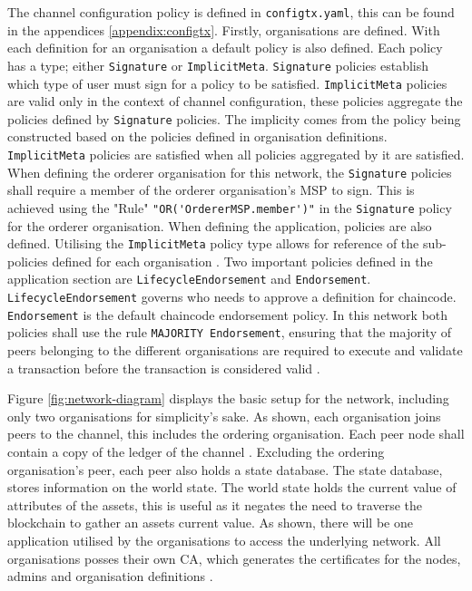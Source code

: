 The channel configuration policy is defined in \lstinline{configtx.yaml}, this can be found in the appendices \ref{appendix:configtx}. 
Firstly, organisations are defined. With each definition for an organisation a default policy is also defined. 
Each policy has a type; either \lstinline{Signature} or \lstinline{ImplicitMeta}. 
\lstinline{Signature} policies establish which type of user must sign for a policy to be satisfied. 
\lstinline{ImplicitMeta} policies are valid only in the context of channel configuration, these policies aggregate the policies defined by \lstinline{Signature} policies. 
The implicity comes from the policy being constructed based on the policies defined in organisation definitions. 
\lstinline{ImplicitMeta} policies are satisfied when all policies aggregated by it are satisfied. \cite{noauthor_policies_nodate}
When defining the orderer organisation for this network, the \lstinline{Signature} policies shall require a member of the orderer organisation's MSP to sign. 
This is achieved using the "Rule" \lstinline{"OR('OrdererMSP.member')"} in the \lstinline{Signature} policy for the orderer organisation. 
When defining the application, policies are also defined. 
Utilising the \lstinline{ImplicitMeta} policy type allows for reference of the sub-policies defined for each organisation \cite{noauthor_policies_nodate}. 
Two important policies defined in the application section are \lstinline{LifecycleEndorsement} and \lstinline{Endorsement}. 
\lstinline{LifecycleEndorsement} governs who needs to approve a definition for chaincode. 
\lstinline{Endorsement} is the default chaincode endorsement policy. 
In this network both policies shall use the rule \lstinline{MAJORITY Endorsement}, ensuring that the majority of peers belonging to the different organisations are required to execute and validate a transaction before the transaction is considered valid \cite{noauthor_policies_nodate}.

Figure \ref{fig:network-diagram} displays the basic setup for the network, including only two organisations for simplicity's sake. 
As shown, each organisation joins peers to the channel, this includes the ordering organisation. 
Each peer node shall contain a copy of the ledger of the channel \cite{noauthor_how_nodate}. 
Excluding the ordering organisation's peer, each peer also holds a state database. 
The state database, stores information on the world state. 
The world state holds the current value of attributes of the assets, this is useful as it negates the need to traverse the blockchain to gather an assets current value. \cite{noauthor_ledger_nodate}
As shown, there will be one application utilised by the organisations to access the underlying network. 
All organisations posses their own CA, which generates the certificates for the nodes, admins and organisation definitions \cite{noauthor_how_nodate}.

